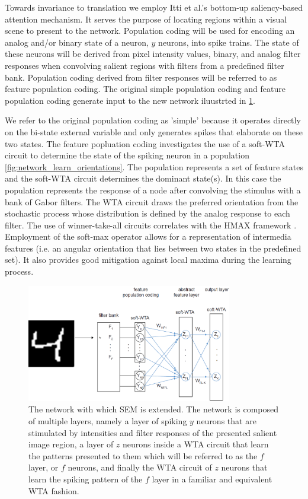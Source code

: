 \documentclass{report}
\begin{document}
Towards invariance to translation we employ Itti et al.'s bottom-up saliency-based attention mechanism. It serves the purpose of locating regions within a visual scene to present to the network. Population coding will be used for encoding an analog and/or binary state of a neuron, $y$ neurons, into spike trains. The state of these neurons will be derived from pixel intensity values, binary, and analog filter responses when convolving salient regions with filters from a predefined filter bank. Population coding derived from filter responses will be referred to as feature population coding. The original simple population coding and feature population coding generate input to the new network iluustrted in \cref{fig:fig_network}.

We refer to the original population coding as 'simple' because it operates directly on the bi-state external variable and only generates spikes that elaborate on these two states. The feature popluation coding investigates the use of a soft-WTA circuit to determine the state of the spiking neuron in a population \ref{fig:network_learn_orientations}. The population represents a set of feature states and the soft-WTA circuit determines the dominant state(s). In this case the population represents the response of a node after convolving the stimulus with a bank of Gabor filters. The WTA circuit draws the preferred orientation from the stochastic process whose distribution is defined by the analog response to each filter. The use of winner-take-all circuits correlates with the HMAX framework \cite{Serre2004, Riesenhuber1999}. Employment of the soft-max operator allows for a representation of intermedia features (i.e. an angular orientation that lies between two states in the predefined set). It also provides good mitigation against local maxima during the learning process.

\begin{figure}[ht]
\centering
\includegraphics[width=0.8\textwidth]{network}
\caption{The network with which SEM is extended. The network is composed of multiple layers, namely a layer of spiking $y$ neurons that are stimulated by intensities and filter responses of the presented salient image region, a layer of $z$ neurons inside a WTA circuit that learn the patterns presented to them which will be referred to as the $f$ layer, or $f$ neurons, and finally the WTA circuit of $z$ neurons that learn the spiking pattern of the $f$ layer in a familiar and equivalent WTA fashion.
\label{fig:fig_network}}
\end{figure}
\end{document}
